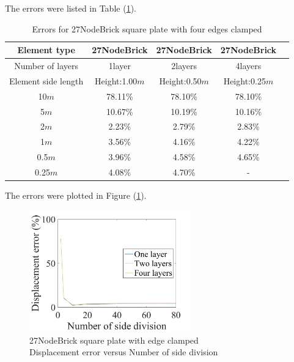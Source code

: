 \documentclass[fleqn,11pt,letter]{article}
\begin{document}

The errors were listed in Table (\ref{table Errors for 27NodeBrick square plate with four edges clamped}).

\begin{table}[H]
  \centering
  \caption{Errors for 27NodeBrick square plate with four edges clamped}
  \label{table Errors for 27NodeBrick square plate with four edges clamped}
\begin{tabular}{|c|c|c|c|c|}
\hline
Element type     & 27NodeBrick     & 27NodeBrick     & 27NodeBrick      \\ \hline
Number of layers & 1layer         & 2layers         & 4layers          \\ \hline
Element side length & Height:1.00$m$ & Height:0.50$m$ & Height:0.25$m$  \\ \hline
10$m$            & 78.11\% & 78.10\% & 78.10\%       \\ \hline
5$m$             & 10.67\% & 10.19\% & 10.16\%       \\ \hline
2$m$             & 2.23\%  & 2.79\%  & 2.83\%        \\ \hline
1$m$             & 3.56\%  & 4.16\%  & 4.22\%        \\ \hline
0.5$m$           & 3.96\%  & 4.58\%  & 4.65\%        \\ \hline
0.25$m$          & 4.08\%  & 4.70\%  &    -         \\
\hline
\end{tabular}
\end{table}

The errors were plotted in Figure (\ref{fig 27NodeBrick square plate with edge clamped}).

\begin{figure}[H]
  \centering
  \includegraphics[width=7cm]{../Figure_files/27NodeBrick/error27brick_square_plate_clamped100.jpeg}
  \captionsetup{justification=centering,margin=3cm}
  \caption{27NodeBrick square plate with edge clamped\\
      Displacement error   versus   Number of side division}
  \label{fig 27NodeBrick square plate with edge clamped}
\end{figure}
\end{document}
